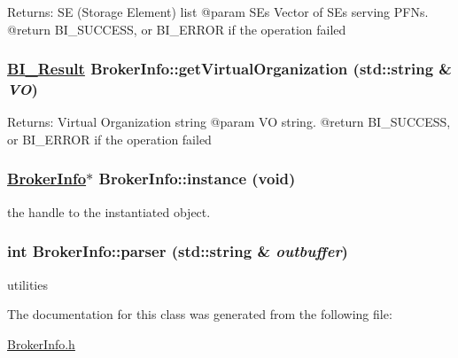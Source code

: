 \begin{Desc}
\item[Returns:]SE (Storage Element) list @param SEs Vector of SEs serving PFNs. @return BI\_\-SUCCESS, or BI\_\-ERROR if the operation failed \end{Desc}
\hypertarget{classBrokerInfo_a12}{
\subsubsection[getVirtualOrganization]{\setlength{\rightskip}{0pt plus 5cm}\hyperlink{bi__result_8h_a2}{BI\_\-Result} Broker\-Info::get\-Virtual\-Organization (std::string \& {\em VO})}}
\label{classBrokerInfo_a12}


\begin{Desc}
\item[Returns:]Virtual Organization string @param VO string. @return BI\_\-SUCCESS, or BI\_\-ERROR if the operation failed \end{Desc}
\hypertarget{classBrokerInfo_e0}{
\subsubsection[instance]{\setlength{\rightskip}{0pt plus 5cm}\hyperlink{classBrokerInfo}{Broker\-Info}$\ast$ Broker\-Info::instance (void)}}
\label{classBrokerInfo_e0}


the handle to the instantiated object. \hypertarget{classBrokerInfo_a13}{
\subsubsection[parser]{\setlength{\rightskip}{0pt plus 5cm}int Broker\-Info::parser (std::string \& {\em outbuffer})}}
\label{classBrokerInfo_a13}


utilities 

The documentation for this class was generated from the following file:\begin{CompactItemize}
\item 
\hyperlink{BrokerInfo_8h}{Broker\-Info.h}\end{CompactItemize}
